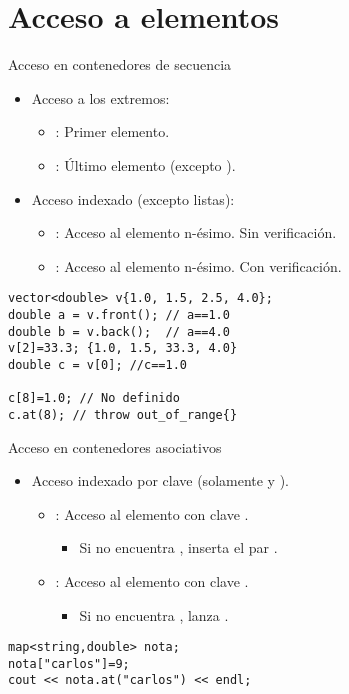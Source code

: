 \section{Acceso a elementos}

\begin{frame}[t,fragile]{Acceso en contenedores de secuencia}
\begin{itemize}
  \item Acceso a los extremos:
    \begin{itemize}
      \item {}: Primer elemento.
      \item {}: Último elemento (excepto ).
    \end{itemize}

  \vfill\pause
  \item Acceso indexado (excepto listas):
    \begin{itemize}
      \item {}: Acceso al elemento n-ésimo. Sin verificación.
      \item {}: Acceso al elemento n-ésimo. Con verificación.
    \end{itemize}
\end{itemize}
\begin{lstlisting}
vector<double> v{1.0, 1.5, 2.5, 4.0};
double a = v.front(); // a==1.0
double b = v.back();  // a==4.0
v[2]=33.3; {1.0, 1.5, 33.3, 4.0}
double c = v[0]; //c==1.0

c[8]=1.0; // No definido
c.at(8); // throw out_of_range{}
\end{lstlisting}
\end{frame}

\begin{frame}[t,fragile]{Acceso en contenedores asociativos}
\begin{itemize}
  \item Acceso indexado por clave (solamente  y ).
    \begin{itemize}
      \item {}: Acceso al elemento con clave .
        \begin{itemize}
          \item Si no encuentra , inserta el par .
        \end{itemize}
      \item {}: Acceso al elemento con clave .
        \begin{itemize}
          \item Si no encuentra , lanza .
        \end{itemize}
    \end{itemize}
\end{itemize}
\begin{lstlisting}
map<string,double> nota;
nota["carlos"]=9;
cout << nota.at("carlos") << endl;
\end{lstlisting}
\end{frame}
